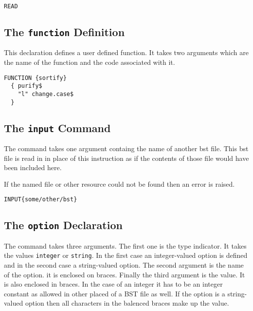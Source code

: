 \begin{lstlisting}[language=bst]
  READ
\end{lstlisting}


\subsection{The \texttt{function} Definition}

This declaration defines a user defined function. It takes two
arguments which are the name of the function and the code associated
with it.

\begin{lstlisting}[language=bst]
  FUNCTION {sortify}
  { purify$
    "l" change.case$
  }
\end{lstlisting}


\subsection{The \texttt{input} Command}

The command takes one argument containg the name of another bst file.
This bst file is read in in place of this instruction as if the
contents of those file would have been included here. 

If the named file or other resource could not be found then an error
is raised.

\begin{lstlisting}[language=bst]
  INPUT{some/other/bst}
\end{lstlisting}


\subsection{The \texttt{option} Declaration}

The command takes three arguments. The first one is the type
indicator. It takes the values \texttt{integer} or \texttt{string}. In
the first case an integer-valued option is defined and in the second
case a string-valued option. The second argument is the name of the
option. it is enclosed on braces. Finally the third argument is the
value. It is also enclosed in braces. In the case of an integer it has
to be an integer constant as allowed in other placed of a BST file as
well. If the option is a string-valued option then all characters in
the balenced braces make up the value.

